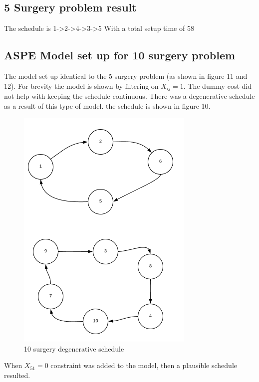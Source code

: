 \documentclass[]{article}
\begin{document}
\subsection{5 Surgery problem result}\label{surgery-problem-result}

The schedule is
1-\textgreater{}2-\textgreater{}4-\textgreater{}3-\textgreater{}5 With a
total setup time of 58

\subsection{ASPE Model set up for 10 surgery
problem}\label{aspe-model-set-up-for-10-surgery-problem}

The model set up identical to the 5 surgery problem (as shown in figure
11 and 12). For brevity the model is shown by filtering on
\(X_{ij} = 1\). The dummy cost did not help with keeping the schedule
continuous. There was a degenerative schedule as a result of this type
of model. the schedule is shown in figure 10.

\begin{figure}[h]

{\centering \includegraphics{Figures/Homework3/p3bsnW} 

}

\caption{10 surgery degenerative schedule}\label{fig:unnamed-chunk-10}
\end{figure}

When \(X_{51} = 0\) constraint was added to the model, then a plausible
schedule resulted.
\end{document}
